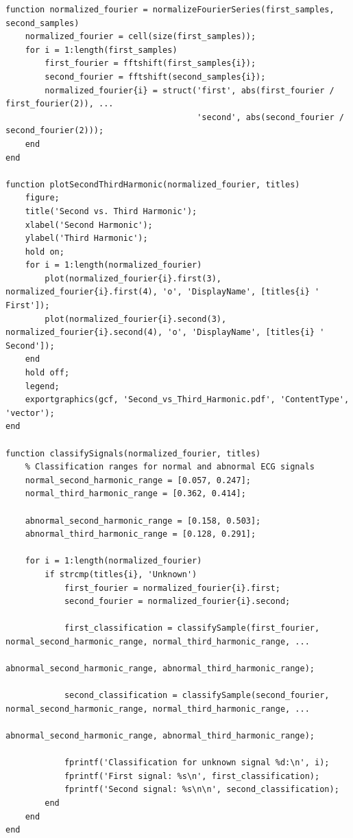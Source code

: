 \documentclass{zc-ust-hw}
\begin{document}
\begin{verbatim}
function normalized_fourier = normalizeFourierSeries(first_samples, second_samples)
    normalized_fourier = cell(size(first_samples));
    for i = 1:length(first_samples)
        first_fourier = fftshift(first_samples{i});
        second_fourier = fftshift(second_samples{i});
        normalized_fourier{i} = struct('first', abs(first_fourier / first_fourier(2)), ...
                                       'second', abs(second_fourier / second_fourier(2)));
    end
end

function plotSecondThirdHarmonic(normalized_fourier, titles)
    figure;
    title('Second vs. Third Harmonic');
    xlabel('Second Harmonic');
    ylabel('Third Harmonic');
    hold on;
    for i = 1:length(normalized_fourier)
        plot(normalized_fourier{i}.first(3), normalized_fourier{i}.first(4), 'o', 'DisplayName', [titles{i} ' First']);
        plot(normalized_fourier{i}.second(3), normalized_fourier{i}.second(4), 'o', 'DisplayName', [titles{i} ' Second']);
    end
    hold off;
    legend;
    exportgraphics(gcf, 'Second_vs_Third_Harmonic.pdf', 'ContentType', 'vector');
end

function classifySignals(normalized_fourier, titles)
    % Classification ranges for normal and abnormal ECG signals
    normal_second_harmonic_range = [0.057, 0.247];
    normal_third_harmonic_range = [0.362, 0.414];
    
    abnormal_second_harmonic_range = [0.158, 0.503];
    abnormal_third_harmonic_range = [0.128, 0.291];
    
    for i = 1:length(normalized_fourier)
        if strcmp(titles{i}, 'Unknown')
            first_fourier = normalized_fourier{i}.first;
            second_fourier = normalized_fourier{i}.second;
            
            first_classification = classifySample(first_fourier, normal_second_harmonic_range, normal_third_harmonic_range, ...
                                                  abnormal_second_harmonic_range, abnormal_third_harmonic_range);
            
            second_classification = classifySample(second_fourier, normal_second_harmonic_range, normal_third_harmonic_range, ...
                                                   abnormal_second_harmonic_range, abnormal_third_harmonic_range);
            
            fprintf('Classification for unknown signal %d:\n', i);
            fprintf('First signal: %s\n', first_classification);
            fprintf('Second signal: %s\n\n', second_classification);
        end
    end
end


\end{verbatim}
\end{document}
